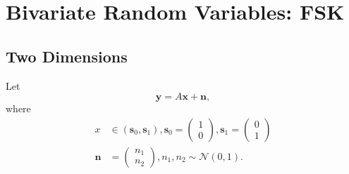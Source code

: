 \documentclass[12pt]{book}
\providecommand{\mbf}{\mathbf}
\providecommand{\brak}[1]{\ensuremath{\left(#1\right)}}
\providecommand{\gauss}[2]{\mathcal{N}\ensuremath{\left(#1,#2\right)}}
\begin{document}
\chapter{Bivariate Random Variables: FSK}
\section{Two Dimensions}
Let 
\begin{equation}
\mbf{y} = A\mbf{x} + \mbf{n},
\end{equation}
where 
\begin{align}
x &\in \brak{\mbf{s}_0,\mbf{s}_1}, 
\mbf{s}_0 = 
\begin{pmatrix}
1 
\\
0
\end{pmatrix},
\mbf{s}_1 = 
\begin{pmatrix}
0 
\\
1
\end{pmatrix}
\\
\mbf{n} &= 
\begin{pmatrix}
n_1
\\
n_2
\end{pmatrix},
n_1,n_2 \sim \gauss{0}{1}.
\end{align}
%
\end{document}
